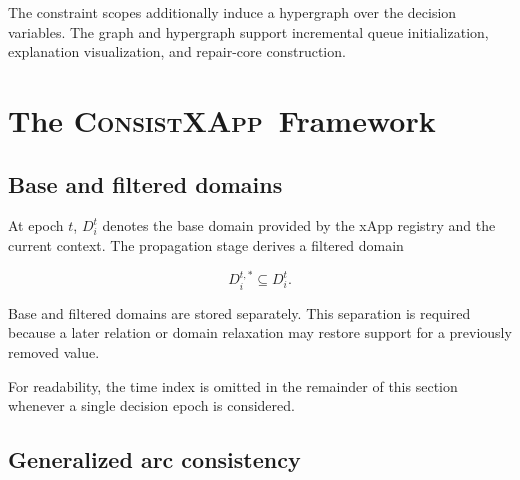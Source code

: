 \documentclass[pdflatex,sn-mathphys-num,iicol,oneside]{sn-jnl}
\newcommand{\method}{\textsc{ConsistXApp}}
\begin{document}
The constraint scopes additionally induce a hypergraph over the
decision variables. The graph and hypergraph support incremental
queue initialization, explanation visualization, and repair-core
construction.



\section{The \method\ Framework}
\label{sec:method}

\subsection{Base and filtered domains}

At epoch $t$, $D_i^t$ denotes the base domain provided by the xApp
registry and the current context. The propagation stage derives a
filtered domain

\begin{equation}
D_i^{t,*}\subseteq D_i^t.
\end{equation}

Base and filtered domains are stored separately. This separation is
required because a later relation or domain relaxation may restore
support for a previously removed value.

For readability, the time index is omitted in the remainder of this
section whenever a single decision epoch is considered.

\subsection{Generalized arc consistency}
\end{document}
